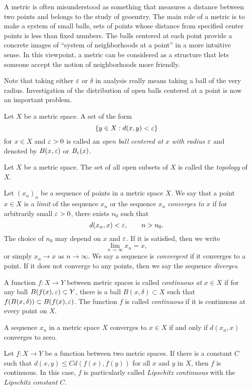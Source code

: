 \documentclass{../../large}
\begin{document}
\begin{prb}
A metric is often misunderstood as something that measures a distance between two points and belongs to the study of geoemtry.
The main role of a metric is to make a system of small balls, sets of points whose distance from specified center points is less than fixed numbers.
The balls centered at each point provide a concrete images of ``system of neighborhoods at a point'' in a more intuitive sense.
In this viewpoint, a metric can be considered as a structure that lets someone accept the notion of neighborhoods more friendly.

Note that taking either $\varepsilon$ or $\delta$ in analysis really means taking a ball of the very radius.
Investigation of the distribution of open balls centered at a point is now an important problem.

Let $X$ be a metric space.
A set of the form 
\[\{y\in X:d(x,y)<\varepsilon\}\]
for $x\in X$ and $\varepsilon>0$ is called an \emph{open ball centered at $x$ with radius $\varepsilon$} and denoted by $B(x,\varepsilon)$ or $B_\varepsilon(x)$.
\end{prb}


\begin{prb}
Let $X$ be a metric space.
The set of all open subsets of $X$ is called the \emph{topology} of $X$.
\end{prb}


\begin{prb}
Let $(x_n)_n$ be a sequence of points in a metric space $X$.
We say that a point $x\in X$ is a \emph{limit} of the sequence $x_n$ or the sequence $x_n$ \emph{converges to $x$} if for arbitrarily small $\varepsilon>0$, there exists $n_0$ such that
\[d(x_n,x)<\varepsilon,\qquad n>n_0.\]
The choice of $n_0$ may depend on $x$ and $\varepsilon$.
If it is satisfied, then we write
\[\lim_{n\to\infty}x_n=x,\]
or simply $x_n\to x$ as $n\to\infty$.
We say a sequence is \emph{convergent} if it converges to a point.
If it does not converge to any points, then we say the sequence \emph{diverges}.

A function $f:X\to Y$ between metric spaces is called \emph{continuous at $x\in X$} if for any ball $B(f(x),\varepsilon)\subset Y$, there is a ball $B(x,\delta)\subset X$ such that $f(B(x,\delta))\subset B(f(x),\varepsilon)$.
The function $f$ is called \emph{continuous} if it is continuous at every point on $X$.
\begin{parts}
\item A sequence $x_n$ in a metric space $X$ converges to $x\in X$ if and only if $d(x_n,x)$ converges to zero.
\item 
Let $f:X\to Y$ be a function between two metric spaces.
If there is a constant $C$ such that $d(x,y)\le Cd(f(x),f(y))$ for all $x$ and $y$ in $X$, then $f$ is continuous.
In this case, $f$ is particularly called \emph{Lipschitz continuous} with the \emph{Lipschitz constant} $C$.
\end{parts}
\end{prb}
\end{document}
